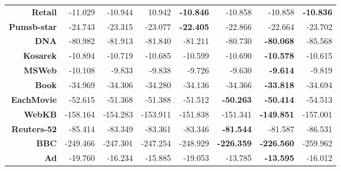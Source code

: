 \documentclass[final]{beamer}
\begin{document}
\begin{frame}{}
\begin{textblock}{25.2}
\begin{table}[!htbp]
\begin{tabular}{r r r r r r r r}
          \textbf{Retail}     & -11.029           & -10.944        & 10.942          & \textbf{-10.846} & -10.858           & -10.858           & \textbf{-10.836} \\
          \textbf{Pumsb-star} & -24.743           & -23.315        & -23.077         & \textbf{-22.405} & -22.866           & -22.664           & -23.702          \\
          \textbf{DNA}        & -80.982           & -81.913        & -81.840         & -81.211          & -80.730           & \textbf{-80.068}  & -85.568          \\
          \textbf{Kosarek}    & -10.894           & -10.719        & -10.685         & -10.599          & -10.690           & \textbf{-10.578}  & -10.615          \\
          \textbf{MSWeb}      & -10.108           & -9.833         & -9.838          & -9.726           & -9.630            & \textbf{-9.614}   & -9.819           \\
          \textbf{Book}       & -34.969           & -34.306        & -34.280         & -34.136          & -34.366           & \textbf{-33.818}  & -34.694          \\
          \textbf{EachMovie}  & -52.615           & -51.368        & -51.388         & -51.512          & \textbf{-50.263}  & \textbf{-50.414}  & -54.513          \\
          \textbf{WebKB}      & -158.164          & -154.283       & -153.911        & -151.838         & -151.341          & \textbf{-149.851} & -157.001         \\
          \textbf{Reuters-52} & -85.414           & -83.349        & -83.361         & -83.346          & \textbf{-81.544}  & -81.587           & -86.531          \\
          \textbf{BBC}        & -249.466          & -247.301       & -247.254        & -248.929         & \textbf{-226.359} & \textbf{-226.560} & -259.962         \\
          \textbf{Ad}         & -19.760           & -16.234        & -15.885         & -19.053          & -13.785           & \textbf{-13.595}  & -16.012          \\
          \bottomrule
        \end{tabular}

\end{table}
\end{textblock}
\end{frame}
\end{document}
